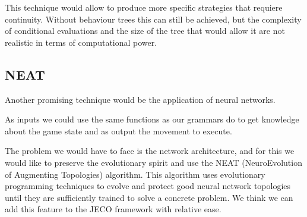 This technique would allow to produce more specific strategies that requiere continuity. Without behaviour trees this can still be achieved, but the complexity of conditional evaluations and the size of the tree that would allow it are not realistic in terms of computational power.


\subsection{NEAT}

Another promising technique would be the application of neural networks.

As inputs we could use the same functions as our grammars do to get knowledge about the game state and as output the movement to execute.

The problem we would have to face is the network architecture, and for this we would like to preserve the evolutionary spirit and use the NEAT (NeuroEvolution of Augmenting Topologies) algorithm. This algorithm uses evolutionary programming techniques to evolve and protect good neural network topologies until they are sufficiently trained to solve a concrete problem. We think we can add this feature to the JECO framework with relative ease.
